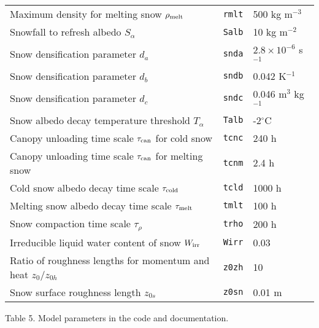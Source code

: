 \documentclass{article}
\begin{document}
\begin{tabular}{|l|l|l|}
Maximum density for melting snow $\rho_{\rm melt}$ & {\tt rmlt} & 500 kg m$^{-3}$ \\
Snowfall to refresh albedo $S_\alpha$ & {\tt Salb} & 10 kg m$^{-2}$ \\
Snow densification parameter $d_a$ & {\tt snda} & $2.8 \times 10^{-6}$ s$^{-1}$ \\
Snow densification parameter $d_b$ & {\tt sndb} & 0.042 K$^{-1}$ \\
Snow densification parameter $d_c$ & {\tt sndc} & 0.046 m$^3$ kg$^{-1}$ \\
Snow albedo decay temperature threshold $T_\alpha$ & {\tt Talb} & -2$^\circ$C \\
Canopy unloading time scale $\tau_{\rm can}$ for cold snow & {\tt tcnc} & 240 h \\
Canopy unloading time scale $\tau_{\rm can}$ for melting snow & {\tt tcnm} & 2.4 h \\
Cold snow albedo decay time scale $\tau_{\rm cold}$ & {\tt tcld} & 1000 h \\
Melting snow albedo decay time scale $\tau_{\rm melt}$ & {\tt tmlt} & 100 h \\
Snow compaction time scale $\tau_\rho$ & {\tt trho} & 200 h \\
Irreducible liquid water content of snow $W_{\rm irr}$ & {\tt Wirr} & 0.03 \\
Ratio of roughness lengths for momentum and heat $z_0/z_{0h}$ & {\tt z0zh} & 10 \\
Snow surface roughness length $z_{0s}$ & {\tt z0sn} & 0.01 m \\
\hline
\end{tabular}

Table 5. Model parameters in the code and documentation.
\end{document}
